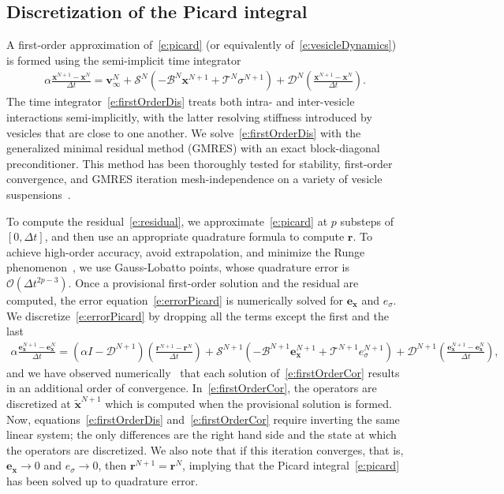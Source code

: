 \documentclass[3p,times,procedia]{elsarticle}
\newcommand{\rr}{{\mathbf{r}}}
\newcommand{\vv}{{\mathbf{v}}}
\newcommand{\xx}{{\mathbf{x}}}
\newcommand{\exx}{\mathbf{e}_{\xx}}
\newcommand{\esigma}{e_{\sigma}}
\newcommand{\txx}{{\tilde{\xx}}}
\newcommand{\BB}{{\mathcal{B}}}
\newcommand{\DD}{{\mathcal{D}}}
\renewcommand{\SS}{{\mathcal{S}}}
\newcommand{\TT}{{\mathcal{T}}}
\begin{document}
\subsection{Discretization of the Picard integral}
A first-order approximation of~\eqref{e:picard} (or equivalently
of~\eqref{e:vesicleDynamics}) is formed using the
semi-implicit time integrator
\begin{align}
  \alpha\frac{\xx^{N+1} - \xx^{N}}{\Delta t} = \vv_{\infty}^{N} +
  \SS^{N}\left(-\BB^{N}\xx^{N+1} + \TT^{N}\sigma^{N+1}\right) +
  \DD^{N}\left(\frac{\xx^{N+1} - \xx^{N}}{\Delta t}\right).
  \label{e:firstOrderDis}
\end{align}
The time integrator~\eqref{e:firstOrderDis} treats both intra- and
inter-vesicle interactions semi-implicitly, with the latter resolving
stiffness introduced by vesicles that are close to one another.  We
solve~\eqref{e:firstOrderDis} with the generalized minimal residual
method (GMRES) with an exact block-diagonal preconditioner.  This method
has been thoroughly tested for stability, first-order convergence, and
GMRES iteration mesh-independence on a variety of vesicle
suspensions~\cite{qua:bir2014b}.

To compute the residual~\eqref{e:residual}, we
approximate~\eqref{e:picard} at $p$ substeps of $[0,\Delta t]$, and then
use an appropriate quadrature formula to compute $\rr$.  To achieve
high-order accuracy, avoid extrapolation, and minimize the Runge
phenomenon~\cite{dav1975}, we use Gauss-Lobatto points, whose quadrature
error is $\mathcal{O}(\Delta t^{2p-3})$.  Once a provisional first-order
solution and the residual are computed, the error
equation~\eqref{e:errorPicard} is numerically solved for $\exx$ and
$\esigma$.  We discretize~\eqref{e:errorPicard} by dropping all the
terms except the first and the last
\begin{align}
  \alpha\frac{\exx^{N+1} - \exx^{N}}{\Delta t} = 
  \left(\alpha I - \DD^{N+1}\right)
  \left(\frac{\rr^{N+1} - \rr^{N}}{\Delta t}\right) +
  \SS^{N+1}\left(-\BB^{N+1}\exx^{N+1} + \TT^{N+1}\esigma^{N+1}\right) +
  \DD^{N+1}\left(\frac{\exx^{N+1} - \exx^{N}}{\Delta t}\right),
  \label{e:firstOrderCor}
\end{align}
and we have observed numerically~\cite{qua:bir2014c} that each solution
of~\eqref{e:firstOrderCor} results in an additional order of
convergence.  In~\eqref{e:firstOrderCor}, the operators are discretized
at $\txx^{N+1}$ which is computed when the provisional solution is
formed.  Now, equations~\eqref{e:firstOrderDis}
and~\eqref{e:firstOrderCor} require inverting the same linear system;
the only differences are the right hand side and the state at which the
operators are discretized.  We also note that if this iteration
converges, that is, $\exx \rightarrow 0$ and $\esigma \rightarrow 0$,
then $\rr^{N+1} = \rr^{N}$, implying that the Picard
integral~\eqref{e:picard} has been solved up to quadrature error.
\end{document}
